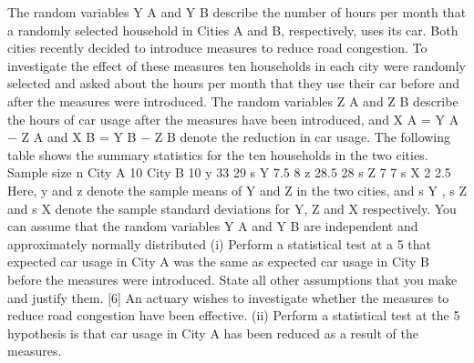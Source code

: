 The random variables Y A and Y B describe the number of hours per month that a
randomly selected household in Cities A and B, respectively, uses its car. Both cities
recently decided to introduce measures to reduce road congestion. To investigate the
effect of these measures ten households in each city were randomly selected and
asked about the hours per month that they use their car before and after the measures
were introduced. The random variables Z A and Z B describe the hours of car usage
after the measures have been introduced, and X A = Y A − Z A and X B = Y B − Z B
denote the reduction in car usage. The following table shows the summary statistics
for the ten households in the two cities.
Sample size n
City A
10
City B
10
y
33
29
s Y
7.5
8
z
28.5
28
s Z
7
7
s X
2
2.5
Here, y and z denote the sample means of Y and Z in the two cities, and s Y , s Z
and s X denote the sample standard deviations for Y, Z and X respectively.
You can assume that the random variables Y A and Y B are independent and
approximately normally distributed
(i)
Perform a statistical test at a 5%
that expected car usage in City A was the same as expected car usage in City
B before the measures were introduced. State all other assumptions that you
make and justify them.
[6]
An actuary wishes to investigate whether the measures to reduce road congestion have
been effective.
(ii) Perform a statistical test at the 5%
hypothesis is that car usage in City A has been reduced as a result of the
measures.

